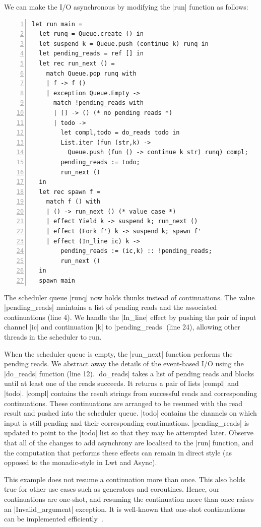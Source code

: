 \documentclass[sigplan,screen]{acmart}
\begin{document}
We can make the I/O asynchronous by modifying the |run| function as follows:

\begin{lstlisting}[numbers=left]
let run main =
  let runq = Queue.create () in
  let suspend k = Queue.push (continue k) runq in
  let pending_reads = ref [] in
  let rec run_next () =
    match Queue.pop runq with
    | f -> f ()
    | exception Queue.Empty ->
      match !pending_reads with
      | [] -> () (* no pending reads *)
      | todo ->
        let compl,todo = do_reads todo in
        List.iter (fun (str,k) ->
          Queue.push (fun () -> continue k str) runq) compl;
        pending_reads := todo;
        run_next ()
  in
  let rec spawn f =
    match f () with
    | () -> run_next () (* value case *)
    | effect Yield k -> suspend k; run_next ()
    | effect (Fork f') k -> suspend k; spawn f'
    | effect (In_line ic) k ->
        pending_reads := (ic,k) :: !pending_reads;
        run_next ()
  in
  spawn main
\end{lstlisting}

The scheduler queue |runq| now holds thunks instead of continuations. The value
|pending_reads| maintains a list of pending reads and the associated
continuations (line 4). We handle the |In_line| effect by pushing the pair of
input channel |ic| and continuation |k| to |pending_reads| (line 24), allowing
other threads in the scheduler to run.

When the scheduler queue is empty, the |run_next| function performs the pending
reads. We abstract away the details of the event-based I/O using the |do_reads|
function (line 12). |do_reads| takes a list of pending reads and blocks until
at least one of the reads succeeds. It returns a pair of lists |compl| and
|todo|. |compl| contains the result strings from successful reads and
corresponding continuations. These continuations are arranged to be resumed
with the read result and pushed into the scheduler queue. |todo| contains the
channels on which input is still pending and their corresponding continuations.
|pending_reads| is updated to point to the |todo| list so that they may be
attempted later. Observe that all of the changes to add asynchrony are
localised to the |run| function, and the computation that performs these
effects can remain in direct style (as opposed to the monadic-style in
Lwt and Async).

This example does not resume a continuation more than once. This
also holds true for other use cases such as generators and coroutines. Hence,
our continuations are one-shot, and resuming the continuation more than once
raises an |Invalid_argument| exception. It is well-known that one-shot
continuations can be implemented efficiently~\cite{Bruggeman96}.
\end{document}
